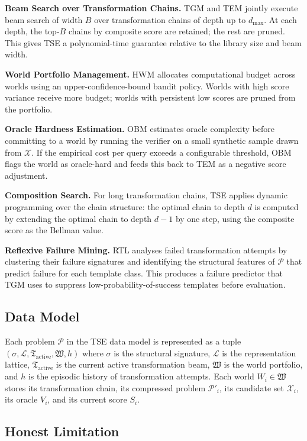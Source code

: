 \textbf{Beam Search over Transformation Chains.} TGM and TEM jointly execute beam search of width $B$ over transformation chains of depth up to $d_{\max}$. At each depth, the top-$B$ chains by composite score are retained; the rest are pruned. This gives TSE a polynomial-time guarantee relative to the library size and beam width.

\textbf{World Portfolio Management.} HWM allocates computational budget across worlds using an upper-confidence-bound bandit policy. Worlds with high score variance receive more budget; worlds with persistent low scores are pruned from the portfolio.

\textbf{Oracle Hardness Estimation.} OBM estimates oracle complexity before committing to a world by running the verifier on a small synthetic sample drawn from $\mathcal{X}$. If the empirical cost per query exceeds a configurable threshold, OBM flags the world as oracle-hard and feeds this back to TEM as a negative score adjustment.

\textbf{Composition Search.} For long transformation chains, TSE applies dynamic programming over the chain structure: the optimal chain to depth $d$ is computed by extending the optimal chain to depth $d-1$ by one step, using the composite score as the Bellman value.

\textbf{Reflexive Failure Mining.} RTL analyses failed transformation attempts by clustering their failure signatures and identifying the structural features of $\mathcal{P}$ that predict failure for each template class. This produces a failure predictor that TGM uses to suppress low-probability-of-success templates before evaluation.

\subsection{Data Model}

Each problem $\mathcal{P}$ in the TSE data model is represented as a tuple $(\sigma, \mathcal{L}, \mathfrak{T}_{\text{active}}, \mathfrak{W}, h)$ where $\sigma$ is the structural signature, $\mathcal{L}$ is the representation lattice, $\mathfrak{T}_{\text{active}}$ is the current active transformation beam, $\mathfrak{W}$ is the world portfolio, and $h$ is the episodic history of transformation attempts. Each world $W_i \in \mathfrak{W}$ stores its transformation chain, its compressed problem $\mathcal{P}'_i$, its candidate set $\mathcal{X}_i$, its oracle $V_i$, and its current score $S_i$.

\subsection{Honest Limitation}

